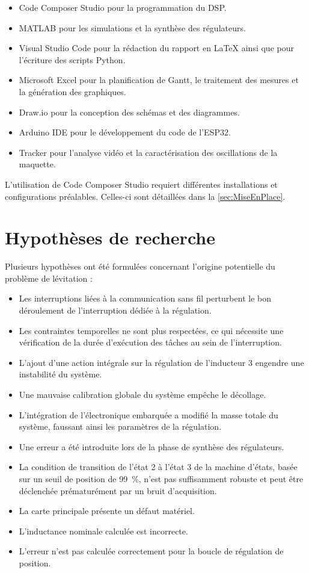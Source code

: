 \begin{itemize}
    \item Code Composer Studio pour la programmation du DSP.
    \item MATLAB pour les simulations et la synthèse des régulateurs.
    \item Visual Studio Code pour la rédaction du rapport en \LaTeX{} ainsi que pour l'écriture des scripts Python.
    \item Microsoft Excel pour la planification de Gantt, le traitement des mesures et la génération des graphiques.
    \item Draw.io pour la conception des schémas et des diagrammes.
    \item Arduino IDE pour le développement du code de l'ESP32.
    \item Tracker pour l'analyse vidéo et la caractérisation des oscillations de la maquette.
\end{itemize}

L'utilisation de Code Composer Studio requiert différentes installations et configurations préalables. Celles-ci sont détaillées dans la \autoref{sec:MiseEnPlace}.

\section{Hypothèses de recherche}
\label{sec:Hypothese}

Plusieurs hypothèses ont été formulées concernant l'origine potentielle du problème de lévitation :

\begin{itemize}
    \item Les interruptions liées à la communication sans fil perturbent le bon déroulement de l'interruption dédiée à la régulation.
    \item Les contraintes temporelles ne sont plus respectées, ce qui nécessite une vérification de la durée d'exécution des tâches au sein de l'interruption.
    \item L'ajout d'une action intégrale sur la régulation de l'inducteur 3 engendre une instabilité du système.
    \item Une mauvaise calibration globale du système empêche le décollage.
    \item L'intégration de l'électronique embarquée a modifié la masse totale du système, faussant ainsi les paramètres de la régulation.
    \item Une erreur a été introduite lors de la phase de synthèse des régulateurs.
    \item La condition de transition de l'état 2 à l'état 3 de la machine d'états, basée sur un seuil de position de 99~\%, n'est pas suffisamment robuste et peut être déclenchée prématurément par un bruit d'acquisition.
    \item La carte principale présente un défaut matériel.
    \item L'inductance nominale calculée est incorrecte.
    \item L'erreur n'est pas calculée correctement pour la boucle de régulation de position.
\end{itemize}


